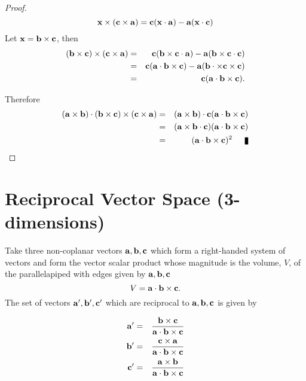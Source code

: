 \begin{proof}
\[ {\bf x} \times ({\bf c}\times {\bf a}) = {\bf c}({\bf x}\cdot {\bf a}) - {\bf a}({\bf x}\cdot {\bf c}) \]
Let ${\bf x} = {\bf b} \times {\bf c}$, then 
\begin{eqnarray*}
({\bf b}\times {\bf c}) \times ({\bf c}\times {\bf a}) & =&  {\bf c}({\bf b}\times {\bf c} \cdot {\bf a}) - {\bf a}({\bf b}\times{\bf c}\cdot {\bf c}) \\
                                                                                   & =&  {\bf c}({\bf a}\cdot {\bf b} \times {\bf c}) - {\bf a}({\bf b}\cdot \times{\bf c}\times {\bf c}) \\
                                                                                   & =&  {\bf c}({\bf a}\cdot {\bf b} \times {\bf c}).
\end{eqnarray*}

Therefore 
\begin{eqnarray*}
({\bf a} \times {\bf b})\cdot ({\bf b}\times {\bf c}) \times ({\bf c}\times {\bf a}) & =&  ({\bf a} \times {\bf b})\cdot {\bf c}({\bf a}\cdot {\bf b} \times {\bf c})\\
                                                                                                                                & =&  ({\bf a} \times {\bf b}\cdot {\bf c})({\bf a}\cdot {\bf b} \times {\bf c})\\
                                                                                   & =&  ({\bf a}\cdot {\bf b} \times {\bf c})^2 \qed\\
\end{eqnarray*}
\end{proof}


\section{Reciprocal Vector Space (3-dimensions)}
Take three non-coplanar vectors ${\bf a}, {\bf b}, {\bf c}$ which form a right-handed system of vectors and form the vector scalar product whose magnitude is the volume, $V$, of the parallelapiped with edges given by ${\bf a}, {\bf b}, {\bf c}$ 
\[ V = {\bf a}\cdot{\bf b} \times {\bf c}. \] The set of vectors ${\bf a'}, {\bf b'}, {\bf c'}$ which are reciprocal to ${\bf a}, {\bf b}, {\bf c}$  is given by

\begin{eqnarray*}
{\bf a'}&=& { {\bf b} \times{\bf c}\over {\bf a}\cdot{\bf b} \times {\bf c}} \\   
{\bf b'}&=& { {\bf c} \times{\bf a}\over {\bf a}\cdot{\bf b} \times {\bf c}} \\
{\bf c'}&=& { {\bf a} \times{\bf b}\over {\bf a}\cdot{\bf b} \times {\bf c}} \\
\end{eqnarray*}

